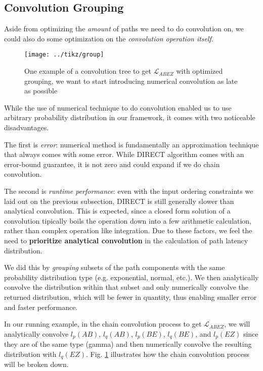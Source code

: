 \subsection{Convolution Grouping}
Aside from optimizing the \textit{amount} of paths we need to do convolution on, we could also do some 
optimization on the \textit{convolution operation itself}. 

\begin{figure}[h]
    \centering
    \texttt{[image: ../tikz/group]}
    \caption{One example of a convolution tree to get $\mathcal{L}_{ABEZ}$ with optimized grouping,
    we want to start introducing numerical convolution as late as possible}
    \label{fig:grouping}
\end{figure}

While the use of numerical technique to do convolution enabled us to use arbitrary probability distribution 
in our framework, it comes with two noticeable disadvantages.

The first is \textit{error}: numerical method is fundamentally an approximation technique that always 
comes with some error. 
While DIRECT algorithm comes with an error-bound guarantee, it is not zero and could expand if we do 
chain convolution.

The second is \textit{runtime performance}: even with the input ordering constraints we laid out on the 
previous subsection, DIRECT is still generally slower than analytical convolution.
This is expected, since a closed form solution of a convolution tipically boils the operation down into 
a few arithmetic calculation, rather than complex operation like integration.
Due to these factors, we feel the need to \textbf{prioritize analytical convolution} in the calculation of 
path latency distribution.

We did this by \textit{grouping} subsets of the path components with the same probability distribution 
type (e.g. exponential, normal, etc.). 
We then analytically convolve the distribution within that subset and only numerically convolve the 
returned distribution, which will be fewer in quantity, thus enabling smaller error and faster performance.

In our running example, in the chain convolution process to get $\mathcal{L}_{ABEZ}$, we will analytically
convolve $l_p(AB)$, $l_q(AB)$, $l_p(BE)$, $l_q(BE)$, and $l_p(EZ)$ since they are of the same type (gamma) 
and then numerically convolve the resulting distribution with $l_q(EZ)$.
Fig. \ref{fig:grouping} illustrates how the chain convolution process will be broken down.

